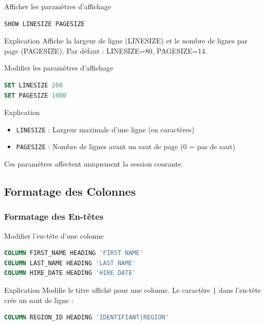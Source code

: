 \documentclass[12pt,a4paper]{article}
\begin{document}
\begin{commande}{Afficher les paramètres d'affichage}
\begin{lstlisting}[language=SQL]
SHOW LINESIZE PAGESIZE
\end{lstlisting}
\end{commande}

\begin{explication}{Explication}
Affiche la largeur de ligne (LINESIZE) et le nombre de lignes par page (PAGESIZE). Par défaut : LINESIZE=80, PAGESIZE=14.
\end{explication}

\begin{commande}{Modifier les paramètres d'affichage}
\begin{lstlisting}[language=SQL]
SET LINESIZE 200
SET PAGESIZE 1000
\end{lstlisting}
\end{commande}

\begin{explication}{Explication}
\begin{itemize}
    \item \texttt{LINESIZE} : Largeur maximale d'une ligne (en caractères)
    \item \texttt{PAGESIZE} : Nombre de lignes avant un saut de page (0 = pas de saut)
\end{itemize}
Ces paramètres affectent uniquement la session courante.
\end{explication}

\subsection{Formatage des Colonnes}

\subsubsection{Formatage des En-têtes}

\begin{commande}{Modifier l'en-tête d'une colonne}
\begin{lstlisting}[language=SQL]
COLUMN FIRST_NAME HEADING 'FIRST NAME'
COLUMN LAST_NAME HEADING 'LAST NAME'
COLUMN HIRE_DATE HEADING 'HIRE DATE'
\end{lstlisting}
\end{commande}

\begin{explication}{Explication}
Modifie le titre affiché pour une colonne. Le caractère \texttt{|} dans l'en-tête crée un saut de ligne :
\begin{lstlisting}[language=SQL]
COLUMN REGION_ID HEADING 'IDENTIFIANT|REGION'
\end{lstlisting}
\end{explication}
\end{document}
